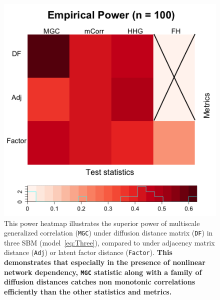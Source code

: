 \documentclass[12pt]{article}
\theoremstyle{definition}
\begin{document}
\begin{figure}
	\centering
	\includegraphics[width=0.4\paperwidth, height=0.4\paperwidth]{../Figure/ThreeSBM_results_simple.png}
	\caption{This power heatmap illustrates the superior power of multiscale generalized correlation (\texttt{MGC}) under diffusion distance matrix (\texttt{DF}) in three SBM (model~\ref{eq:Three}), compared to under adjacency matrix distance (\texttt{Adj}) or latent factor distance (\texttt{Factor}). \textbf{This demonstrates that especially in the presence of nonlinear network dependency, \texttt{MGC} statistic along with a family of diffusion distances catches non monotonic correlations efficiently than the other statistics and metrics.}}
	\label{fig:threeSBM}
\end{figure}
\end{document}
